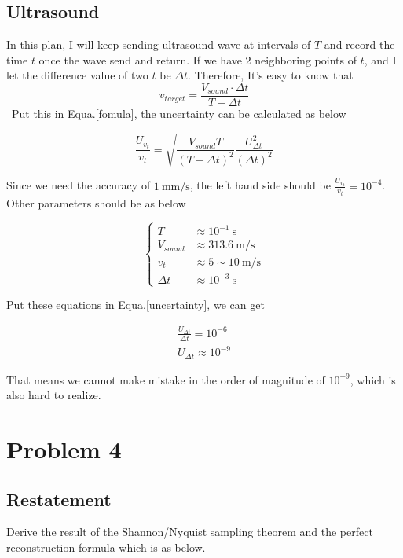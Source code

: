 \documentclass{article}
\begin{document}
\subsection{Ultrasound} In this plan, I will keep sending ultrasound wave at intervals of $T$ and record the time $t$
 once the wave send and return. If we have 2 neighboring points of $t$, and I let the difference value of two $t$ be
 $\Delta t$. Therefore, It's easy to know that
\begin{equation} v_{target} = \frac{V_{sound}  \cdot \Delta t}{T - \Delta t}
\end{equation}
\
Put this in Equa.\ref{fomula}, the uncertainty can be calculated as below

\begin{equation}
    \label{uncertainty}
    \frac{U_{v_t}}{v_t} = \sqrt{\frac{V_{sound}T}{(T-\Delta t)^2} \frac{U_{\Delta t}^2}{(\Delta t)^2}}
\end{equation}

Since we need the accuracy of $1~\mathrm{mm/s}$, the left hand side should be $\frac{U_{v_t}}{v_t} = 10^{-4}$. Other
parameters should be as below

\begin{equation*}
    \left\{
    \begin{array}{ll} T         & \approx 10^{-1} ~ \mathrm{s}     \\ V_{sound} & \approx 313.6 ~ \mathrm{m/s}     \\
     v_t       & \approx 5 \sim 10 ~ \mathrm{m/s} \\
        \Delta t  & \approx 10^{-3} ~ \mathrm{s}
    \end{array}
    \right.
\end{equation*}

Put these equations in Equa.\ref{uncertainty}, we can get

\begin{gather}
    \frac{U_{\Delta t}}{\Delta t} = 10^{-6}\\ U_{\Delta t} \approx 10^{-9}
\end{gather}

That means we cannot make mistake in the order of magnitude of $10^{-9}$, which is also hard to realize.


\section{Problem 4}
\subsection{Restatement} Derive the result of the Shannon/Nyquist sampling theorem and the perfect reconstruction
 formula which is as below.
\end{document}
